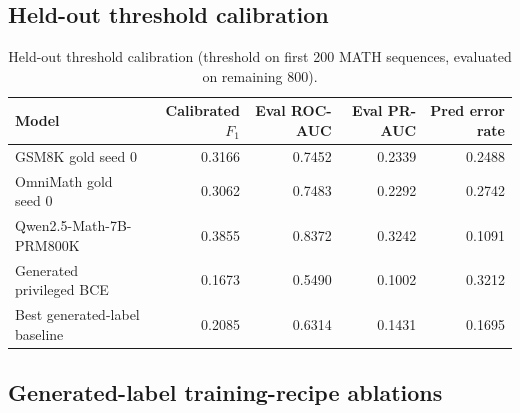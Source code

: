 \documentclass{article}
\begin{document}
\subsection{Held-out threshold calibration}
\label{app:calibration}

\begin{table}[t]
\centering
\small
\begin{tabular}{lrrrr}
\toprule
Model & Calibrated $F_1$ & Eval ROC-AUC & Eval PR-AUC & Pred error rate \\
\midrule
GSM8K gold seed 0 & 0.3166 & 0.7452 & 0.2339 & 0.2488 \\
OmniMath gold seed 0 & 0.3062 & 0.7483 & 0.2292 & 0.2742 \\
Qwen2.5-Math-7B-PRM800K & 0.3855 & 0.8372 & 0.3242 & 0.1091 \\
Generated privileged BCE & 0.1673 & 0.5490 & 0.1002 & 0.3212 \\
Best generated-label baseline & 0.2085 & 0.6314 & 0.1431 & 0.1695 \\
\bottomrule
\end{tabular}
\caption{Held-out threshold calibration (threshold on first 200 MATH
sequences, evaluated on remaining 800).}
\label{tab:mismatch-calibration}
\end{table}

\subsection{Generated-label training-recipe ablations}
\label{app:generated-ablations}

\begin{table}[t]
\centering
\small
{}
\caption{Preliminary generated-label ablations on the Qwen2.5-3B score-head
path. Representative rows from a $\sim$10-configuration sweep; no variant
rescues privileged-label transfer.}
\label{tab:mismatch-ablations}
\end{table}
\end{document}
